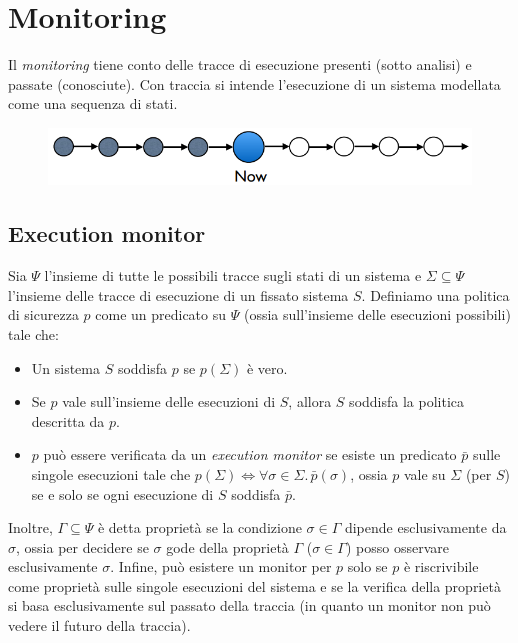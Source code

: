 \documentclass[a4paper,oneside,titlepage]{book}
\begin{document}
\section{Monitoring} %
Il \textit{monitoring} tiene conto delle tracce di esecuzione presenti (sotto analisi) e passate (conosciute). Con traccia si intende l'esecuzione di un sistema modellata come una sequenza di stati.
\begin{figure}[htp]
	\centering
	\includegraphics[width=\textwidth, height=\textheight, keepaspectratio]{monitor1.png}
\end{figure}

\subsection{Execution monitor}
Sia $\Psi$ l'insieme di tutte le possibili tracce sugli stati di un sistema e $\Sigma \subseteq \Psi$ l'insieme delle tracce di esecuzione di un fissato sistema $S$. Definiamo una politica di sicurezza $p$ come un predicato su $\Psi$ (ossia sull'insieme delle esecuzioni possibili) tale che:
\begin{itemize}
    \item Un sistema $S$ soddisfa $p$ se $p(\Sigma)$ è vero.
    \item Se $p$ vale sull'insieme delle esecuzioni di $S$, allora $S$ soddisfa la politica descritta da $p$.
    \item $p$ può essere verificata da un \textit{execution monitor} se esiste un predicato $\bar{p}$ sulle singole esecuzioni tale che $p(\Sigma) \Leftrightarrow \forall \sigma \in \Sigma. \, \bar{p}(\sigma)$, ossia $p$ vale su $\Sigma$ (per $S$) se e solo se ogni esecuzione di $S$ soddisfa $\bar{p}$.
\end{itemize}
Inoltre, $\Gamma \subseteq \Psi$ è detta proprietà se la condizione $\sigma \in \Gamma$ dipende esclusivamente da $\sigma$, ossia per decidere se $\sigma$ gode della proprietà $\Gamma$ ($\sigma \in \Gamma$) posso osservare esclusivamente $\sigma$. Infine, può esistere un monitor per $p$ solo se $p$ è riscrivibile come proprietà sulle singole esecuzioni del sistema e se la verifica della proprietà si basa esclusivamente sul passato della traccia (in quanto un monitor non può vedere il futuro della traccia).
\end{document}

